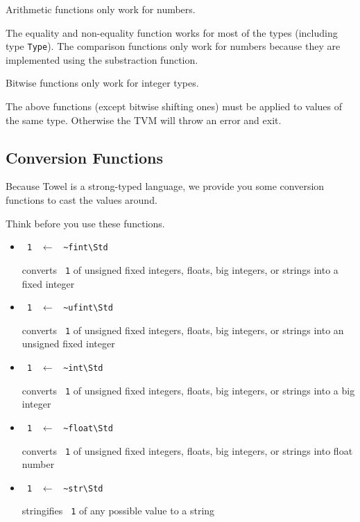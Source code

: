 \documentclass{report}
\newcommand{\mstd}[1]{\texttt{#1\textbackslash Std}}
\newcommand{\mtilde}[1]{\textasciitilde}
\newcommand{\marg}[1]{\texttt{\mtilde ~#1}}
\newcommand{\mla}[0]{~$\leftarrow$ ~}
\begin{document}
\begin{mdframed}[style=hint]
  Arithmetic functions only work for numbers.

  The equality and non-equality function works for most of the types (including type \texttt{Type}).
  The comparison functions only work for numbers because they are implemented using the substraction function.

  Bitwise functions only work for integer types.
\end{mdframed}

\begin{mdframed}[style=hint]
  The above functions (except bitwise shifting ones) must be applied to values of the same type. Otherwise the TVM will throw an error and exit.
\end{mdframed}

\subsection{Conversion Functions}

Because Towel is a strong-typed language, we provide you some conversion functions to cast the values around.

\begin{mdframed}[style=warning]
  Think before you use these functions.
\end{mdframed}

\begin{itemize}
\item \marg1 \mla \mstd{\textasciitilde fint}

converts \marg1 of unsigned fixed integers, floats, big integers, or strings into a fixed integer
\item \marg1 \mla \mstd{\textasciitilde ufint}

converts \marg1 of unsigned fixed integers, floats, big integers, or strings into an unsigned fixed integer
\item \marg1 \mla \mstd{\textasciitilde int}

converts \marg1 of unsigned fixed integers, floats, big integers, or strings into a big integer
\item \marg1 \mla \mstd{\textasciitilde float}

converts \marg1 of unsigned fixed integers, floats, big integers, or strings into float number
\item \marg1 \mla \mstd{\textasciitilde str}

stringifies \marg1 of any possible value to a string
\end{itemize}
\end{document}
